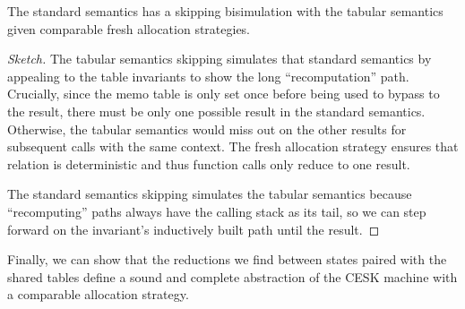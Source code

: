 \begin{theorem}\label{thm:concrete-tabular}
  The standard semantics has a skipping bisimulation with the tabular semantics given comparable fresh allocation strategies.
\end{theorem}
\begin{proof}[Sketch]
  The tabular semantics skipping simulates that standard semantics by appealing to the table invariants to show the long ``recomputation'' path.
  Crucially, since the memo table is only set once before being used to bypass to the result, there must be only one possible result in the standard semantics. Otherwise, the tabular semantics would miss out on the other results for subsequent calls with the same context.
  The fresh allocation strategy ensures that relation is deterministic and thus function calls only reduce to one result.

  The standard semantics skipping simulates the tabular semantics because ``recomputing'' paths always have the calling stack as its tail, so we can step forward on the invariant's inductively built path until the result.
\end{proof}

Finally, we can show that the reductions we find between states paired with the shared tables define a sound and complete abstraction of the CESK machine with a comparable allocation strategy.
